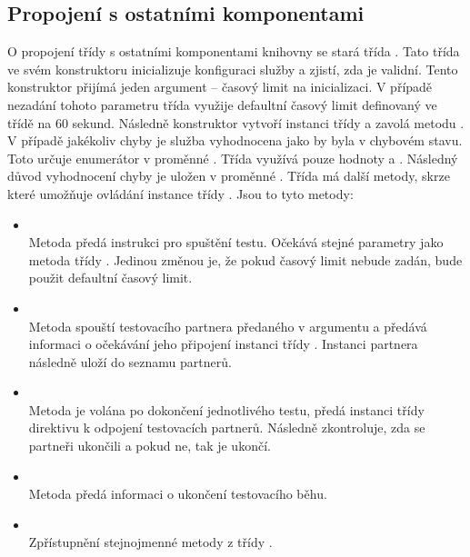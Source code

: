 \subsection{Propojení s ostatními komponentami}

O propojení třídy  s ostatními komponentami knihovny se stará třída .
Tato třída ve svém konstruktoru inicializuje konfiguraci služby a zjistí, zda je validní. Tento konstruktor přijímá jeden argument -- časový limit na inicializaci. V případě nezadání tohoto parametru třída využije defaultní časový limit definovaný ve třídě na 60 sekund. Následně konstruktor vytvoří instanci třídy  a zavolá metodu . V případě jakékoliv chyby je služba vyhodnocena jako by byla v chybovém stavu. Toto určuje enumerátor  v proměnné . Třída využívá pouze hodnoty  a . Následný důvod vyhodnocení chyby je uložen v proměnné . Třída má další metody, skrze které umožňuje ovládání instance třídy . Jsou to tyto metody:

\begin{itemize}
    \item {} \\ Metoda předá instrukci pro spuštění testu. Očekává stejné parametry jako metoda  třídy . Jedinou změnou je, že pokud časový limit nebude zadán, bude použit defaultní časový limit.
    \item {} \\ Metoda spouští testovacího partnera předaného v argumentu a předává informaci o očekávání jeho připojení  instanci třídy . Instanci partnera následně uloží do seznamu partnerů.
    \item {} \\ Metoda je volána po dokončení jednotlivého testu, předá instanci třídy  direktivu k odpojení testovacích partnerů. Následně zkontroluje, zda se partneři ukončili a pokud ne, tak je ukončí.
    \item {} \\ Metoda předá informaci o ukončení testovacího běhu.
    \item {} \\
    Zpřístupnění stejnojmenné metody z třídy .
\end{itemize}

